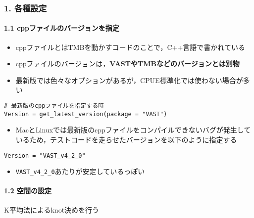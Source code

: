 \documentclass[]{article}
\providecommand{\tightlist}{%
  \setlength{\itemsep}{0pt}\setlength{\parskip}{0pt}}
\let\oldparagraph\paragraph
\renewcommand{\paragraph}[1]{\oldparagraph{#1}\mbox{}}
\begin{document}
\hypertarget{ux5404ux7a2eux8a2dux5b9a}{%
\subsubsection{1. 各種設定}\label{ux5404ux7a2eux8a2dux5b9a}}

\hypertarget{cppux30d5ux30a1ux30a4ux30ebux306eux30d0ux30fcux30b8ux30e7ux30f3ux3092ux6307ux5b9a}{%
\paragraph{1.1
cppファイルのバージョンを指定}\label{cppux30d5ux30a1ux30a4ux30ebux306eux30d0ux30fcux30b8ux30e7ux30f3ux3092ux6307ux5b9a}}

\begin{itemize}
\tightlist
\item
  cppファイルとはTMBを動かすコードのことで，C++言語で書かれている
\item
  cppファイルのバージョンは，\textbf{VASTやTMBなどのバージョンとは別物}
\item
  最新版では色々なオプションがあるが，CPUE標準化では使わない場合が多い
\end{itemize}

\begin{verbatim}
# 最新版のcppファイルを指定する時
Version = get_latest_version(package = "VAST")
\end{verbatim}

\begin{itemize}
\tightlist
\item
  MacとLinuxでは最新版のcppファイルをコンパイルできないバグが発生しているため，テストコードを走らせたバージョンを以下のように指定する
\end{itemize}

\begin{verbatim}
Version = "VAST_v4_2_0"
\end{verbatim}

\begin{itemize}
\tightlist
\item
  \texttt{VAST\_v4\_2\_0}あたりが安定しているっぽい 
\end{itemize}

\hypertarget{ux7a7aux9593ux306eux8a2dux5b9a}{%
\paragraph{1.2 空間の設定}\label{ux7a7aux9593ux306eux8a2dux5b9a}}

K平均法によるknot決めを行う
\end{document}
